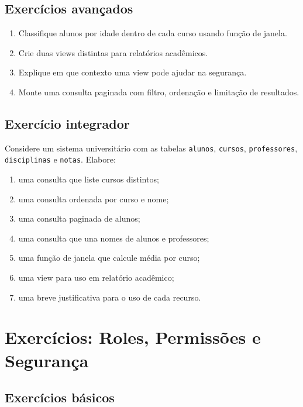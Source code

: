 \subsection{Exercícios avançados}

\begin{enumerate}
    \item Classifique alunos por idade dentro de cada curso usando função de janela.
    \item Crie duas views distintas para relatórios acadêmicos.
    \item Explique em que contexto uma view pode ajudar na segurança.
    \item Monte uma consulta paginada com filtro, ordenação e limitação de resultados.
\end{enumerate}

\subsection{Exercício integrador}

Considere um sistema universitário com as tabelas \texttt{alunos}, \texttt{cursos}, \texttt{professores}, \texttt{disciplinas} e \texttt{notas}. Elabore:

\begin{enumerate}
    \item uma consulta que liste cursos distintos;
    \item uma consulta ordenada por curso e nome;
    \item uma consulta paginada de alunos;
    \item uma consulta que una nomes de alunos e professores;
    \item uma função de janela que calcule média por curso;
    \item uma view para uso em relatório acadêmico;
    \item uma breve justificativa para o uso de cada recurso.
\end{enumerate}



\section{Exercícios: Roles, Permissões e Segurança}
\subsection{Exercícios básicos}

